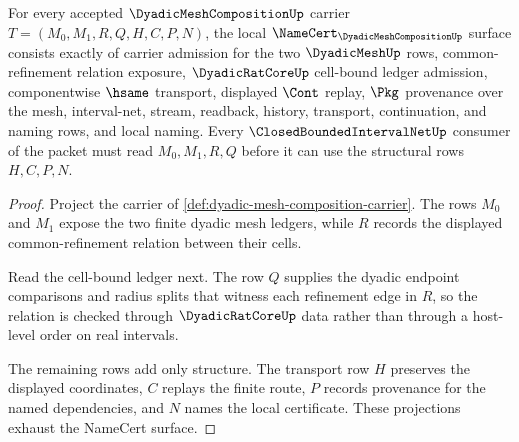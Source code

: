 \begin{theorem}
\label{thm:dyadic-mesh-composition-namecert-obligations}
For every accepted $\DyadicMeshCompositionUp$ carrier $T=(M_0,M_1,R,Q,H,C,P,N)$, the local $\NameCert_{\DyadicMeshCompositionUp}$ surface consists exactly of carrier admission for the two $\DyadicMeshUp$ rows, common-refinement relation exposure, $\DyadicRatCoreUp$ cell-bound ledger admission, componentwise $\hsame$ transport, displayed $\Cont$ replay, $\Pkg$ provenance over the mesh, interval-net, stream, readback, history, transport, continuation, and naming rows, and local naming. Every $\ClosedBoundedIntervalNetUp$ consumer of the packet must read $M_0,M_1,R,Q$ before it can use the structural rows $H,C,P,N$.
\end{theorem}
\begin{proof}
Project the carrier of \autoref{def:dyadic-mesh-composition-carrier}. The rows $M_0$ and $M_1$ expose the two finite dyadic mesh ledgers, while $R$ records the displayed common-refinement relation between their cells.

Read the cell-bound ledger next. The row $Q$ supplies the dyadic endpoint comparisons and radius splits that witness each refinement edge in $R$, so the relation is checked through $\DyadicRatCoreUp$ data rather than through a host-level order on real intervals.

The remaining rows add only structure. The transport row $H$ preserves the displayed coordinates, $C$ replays the finite route, $P$ records provenance for the named dependencies, and $N$ names the local certificate. These projections exhaust the NameCert surface.
\end{proof}

